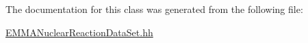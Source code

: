 

The documentation for this class was generated from the following file\-:\begin{DoxyCompactItemize}
\item 
\hyperlink{EMMANuclearReactionDataSet_8hh}{E\-M\-M\-A\-Nuclear\-Reaction\-Data\-Set.\-hh}\end{DoxyCompactItemize}
